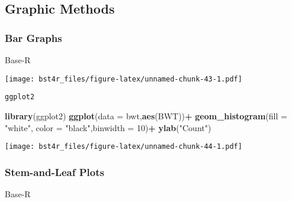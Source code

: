 \documentclass[12pt,]{article}
\newenvironment{Shaded}{\begin{snugshade}}{\end{snugshade}}
\newcommand{\KeywordTok}[1]{\textcolor[rgb]{0.13,0.29,0.53}{\textbf{#1}}}
\newcommand{\DataTypeTok}[1]{\textcolor[rgb]{0.13,0.29,0.53}{#1}}
\newcommand{\DecValTok}[1]{\textcolor[rgb]{0.00,0.00,0.81}{#1}}
\newcommand{\StringTok}[1]{\textcolor[rgb]{0.31,0.60,0.02}{#1}}
\newcommand{\OperatorTok}[1]{\textcolor[rgb]{0.81,0.36,0.00}{\textbf{#1}}}
\newcommand{\NormalTok}[1]{#1}
\theoremstyle{definition}
\theoremstyle{definition}
\theoremstyle{definition}
\theoremstyle{remark}
\begin{document}
\hypertarget{htmlwidget-f3982fcbb333aaa6e68d}{}

\subsection{Graphic Methods}\label{graphic-methods}

\subsubsection{Bar Graphs}\label{bar-graphs}

Base-R

\begin{Shaded}
\end{Shaded}

\texttt{[image: bst4r\_files/figure-latex/unnamed-chunk-43-1.pdf]}

\texttt{ggplot2}

\begin{Shaded}
\begin{Highlighting}[]
\KeywordTok{library}\NormalTok{(ggplot2)}
 \KeywordTok{ggplot}\NormalTok{(}\DataTypeTok{data =}\NormalTok{ bwt,}\KeywordTok{aes}\NormalTok{(BWT))}\OperatorTok{+}
\StringTok{  }\KeywordTok{geom_histogram}\NormalTok{(}\DataTypeTok{fill =} \StringTok{"white"}\NormalTok{, }\DataTypeTok{color =} \StringTok{"black"}\NormalTok{,}\DataTypeTok{binwidth =} \DecValTok{10}\NormalTok{)}\OperatorTok{+}
\StringTok{  }\KeywordTok{ylab}\NormalTok{(}\StringTok{"Count"}\NormalTok{)}
\end{Highlighting}
\end{Shaded}

\texttt{[image: bst4r\_files/figure-latex/unnamed-chunk-44-1.pdf]}

\subsubsection{Stem-and-Leaf Plots}\label{stem-and-leaf-plots}

Base-R

\begin{Shaded}
\end{Shaded}
\end{document}
